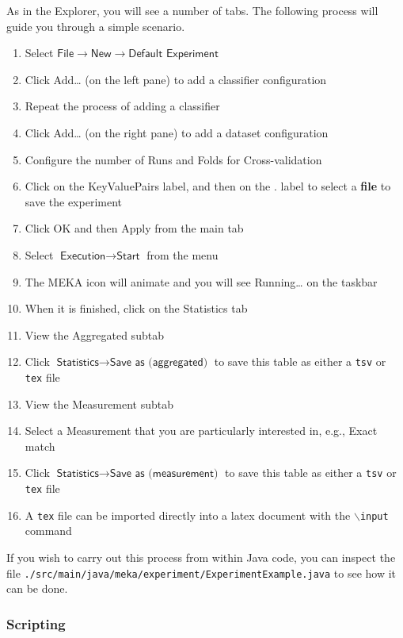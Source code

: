 \documentclass[11pt]{article}
\begin{document}
As in the Explorer, you will see a number of tabs. The following process will guide you through a simple scenario.
\begin{enumerate}
	\item Select $\textsf{File}\rightarrow\textsf{New}\rightarrow\textsf{Default Experiment}$
	\item Click \textsf{Add\ldots} (on the left pane) to add a classifier configuration
	\item Repeat the process of adding a classifier
	\item Click \textsf{Add\ldots} (on the right pane) to add a dataset configuration
	\item Configure the number of \textsf{Runs} and \textsf{Folds} for \textsf{Cross-validation}
	\item Click on the \textsf{KeyValuePairs} label, and then on the \textsf{.} label to select a \textbf{file} to save the experiment
	\item Click \textsf{OK} and then \textsf{Apply} from the main tab
	\item Select $\textsf{Execution}\rightarrow\textsf{Start}$ from the menu
	\item The MEKA icon will animate and you will see \textsf{Running\ldots} on the taskbar
	\item When it is finished, click on the \textsf{Statistics} tab
	\item View the \textsf{Aggregated} subtab
	\item Click $\textsf{Statistics}\rightarrow\textsf{Save as (aggregated)}$ to save this table as either a \texttt{tsv} or \texttt{tex} file
	\item View the \textsf{Measurement} subtab
	\item Select a \textsf{Measurement} that you are particularly interested in, e.g., \textsf{Exact match}
	\item Click $\textsf{Statistics}\rightarrow\textsf{Save as (measurement)}$ to save this table as either a \texttt{tsv} or \texttt{tex} file
	\item A \texttt{tex} file can be imported directly into a latex document with the \texttt{$\backslash$input} command
\end{enumerate}

If you wish to carry out this process from within Java code, you can inspect the file \texttt{./src/main/java/meka/experiment/ExperimentExample.java} to see how it can be done.

\subsubsection{Scripting}
\end{document}
